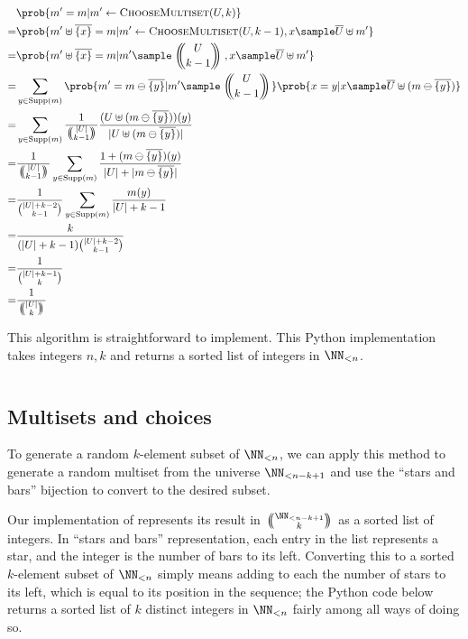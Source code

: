 \documentclass[letterpaper,luatex,11pt]{article}
\newcommand{\multichoose}[2]{
\left.\mathchoice
  {\left(\kern-0.48em\binom{#1}{#2}\kern-0.48em\right)}
  {\big(\kern-0.30em\binom{\smash{#1}}{\smash{#2}}\kern-0.30em\big)}
  {\left(\kern-0.30em\binom{\smash{#1}}{\smash{#2}}\kern-0.30em\right)}
  {\left(\kern-0.30em\binom{\smash{#1}}{\smash{#2}}\kern-0.30em\right)}
\right.}
\DeclareMathOperator{\Supp}{Supp}
\begin{document}
\begin{align*}
    &\prob{m' = m | m' \leftarrow \textproc{ChooseMultiset}(U, k)}
    \\
    =&
    \prob{m' \uplus \overline{\{x\}} = m
        | m' \leftarrow \textproc{ChooseMultiset}(U, k-1), x \sample \overline{U} \uplus m'}
    \\
    =&
    \prob{m' \uplus \overline{\{x\}} = m
        | m' \sample \multichoose{U}{k - 1}, x \sample \overline{U} \uplus m'}
    \\
    =&
    \sum_{y \in \Supp(m)}
    \prob{m' = m \ominus \overline{\{y\}} | m' \sample \multichoose{U}{k - 1}}
    \prob{x = y | x \sample \overline{U} \uplus (m \ominus \overline{\{y\}})}
    \\
    =&
    \sum_{y \in \Supp(m)}
    \frac{1}{\multichoose{|U|}{k - 1}}
    \frac{(U \uplus (m \ominus \overline{\{y\}}))(y)}{|U \uplus (m \ominus \overline{\{y\}})|}
    \\
    =&
    \frac{1}{\multichoose{|U|}{k - 1}}
    \sum_{y \in \Supp(m)}
    \frac{1 + (m \ominus \overline{\{y\}})(y)}{|U| + |m \ominus \overline{\{y\}}|}
    \\
    =&
    \frac{1}{\binom{|U| + k - 2}{k-1}}
    \sum_{y \in \Supp(m)}
    \frac{m(y)}{|U| + k -1}
    \\
    =& \frac{k}{(|U| + k -1)\binom{|U| + k - 2}{k-1}}
    \\
    =& \frac{1}{\binom{|U| + k - 1}{k}}
    \\
    =& \frac{1}{\multichoose{|U|}{k}}
\end{align*}

This algorithm is straightforward to implement. This Python implementation takes integers
$n, k$ and returns a sorted list of integers in \(\NN_{<n}\).

\inputminted{Python}{code/choose_multiset.py}

\subsection{Multisets and choices}

To generate a random \(k\)-element subset of \(\NN_{<n}\),
we can apply this method to generate a random multiset from the universe \(\NN_{<n-k + 1}\)
and use the ``stars and bars'' bijection to convert to the desired subset.

Our implementation of 
represents its result in \(\multichoose{\NN_{<n-k + 1}}{k}\) as a sorted list of integers.
In ``stars and bars'' representation,
each entry in the list represents a star, and the integer is the number of bars to its left.
Converting this to a sorted \(k\)-element subset of \(\NN_{<n}\) simply means adding to each
the number of stars to its left, which is equal to its position in the sequence; the Python code
below returns a sorted list of $k$ distinct integers in \(\NN_{<n}\) fairly among all ways
of doing so.
\end{document}
